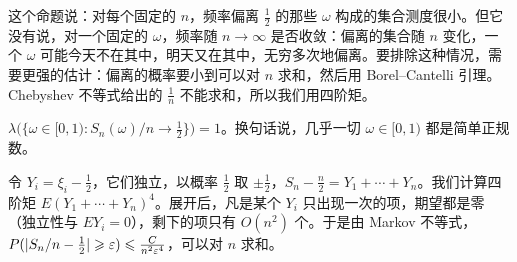 这个命题说：对每个固定的 $n$，频率偏离 $\frac12$ 的那些 $\omega$ 构成的集合测度很小。但它没有说，对一个固定的 $\omega$，频率随 $n\to\infty$ 是否收敛：偏离的集合随 $n$ 变化，一个 $\omega$ 可能今天不在其中，明天又在其中，无穷多次地偏离。要排除这种情况，需要更强的估计：偏离的概率要小到可以对 $n$ 求和，然后用 Borel--Cantelli 引理。Chebyshev 不等式给出的 $\frac1n$ 不能求和，所以我们用四阶矩。

\begin{theorem}\label{thm:independence:borel-normal}
$\lambda\bigl(\{\omega\in[0,1):S_n(\omega)/n\to\frac12\}\bigr)=1$。换句话说，几乎一切 $\omega\in[0,1)$ 都是简单正规数。
\end{theorem}

\begin{remark}[证明思路]
令 $Y_i=\xi_i-\frac12$，它们独立，以概率 $\frac12$ 取 $\pm\frac12$，$S_n-\frac n2=Y_1+\cdots+Y_n$。我们计算四阶矩 $E(Y_1+\cdots+Y_n)^4$。展开后，凡是某个 $Y_i$ 只出现一次的项，期望都是零（独立性与 $EY_i=0$），剩下的项只有 $O(n^2)$ 个。于是由 Markov 不等式，$P(\lvert S_n/n-\frac12\rvert\geqslant\varepsilon)\leqslant\frac C{n^2\varepsilon^4}$，可以对 $n$ 求和。
\end{remark}

